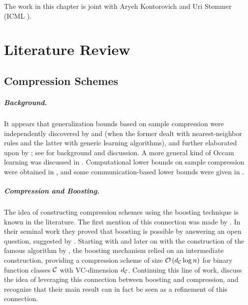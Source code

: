 \documentclass[12pt,a4paper,oneside,onecolumn]{book}
\begin{document}
%

The work in this chapter is joint with Aryeh Kontorovich and Uri Stemmer (ICML \citeyear{pmlr-v162-kontorovich22a}).

\chapter{Literature Review}
\label{sec:litrature}

\section{Compression Schemes}
\paragraph{Background.}
It appears that
generalization bounds
based on sample compression
were
independently discovered by
\citet{1056018} and \citet{littlestone1986relating} 
(when the former dealt with nearest-neighbor rules and the latter with generic learning algorithms),
%
%
and further elaborated upon by \citet{DBLP:journals/ml/GraepelHS05};
see \citet{DBLP:journals/ml/FloydW95} for background and discussion.
A more general kind of Occam learning was discussed in \citet{blumer1989learnability}.
Computational lower bounds on sample compression were
obtained in \citet{gottlieb2014near},
and some communication-based
lower bounds
were given in
\citet{DBLP:journals/corr/abs-1711-05893}.

\paragraph{Compression and Boosting.}
\label{par:comp-and-boost}
The idea of constructing compression schemes using the boosting technique is known in the literature. The first  mention of this connection was made by \citet{FreundSchapire97}. In their seminal work they proved that boosting is possible by answering an open question, suggested by \citet{kearns94crypto}. Starting with \citet{10.5555/92571.92640} and later on with the construction of the famous  algorithm by \citet{FreundSchapire97}, the boosting mechanism relied on an intermediate construction, providing  a compression scheme of size $\mathcal{O}\left(d_{\mathcal{C}} \log n\right)$ for binary function classes $\mathcal{C}$ with VC-dimension $d_{\mathcal{C}}$.
Continuing this line of work,
\citet{moran2016sample} discuss the idea of leveraging this connection between boosting and compression, 
and recognize that their main result can in fact be seen as a refinement of this connection.
\end{document}
